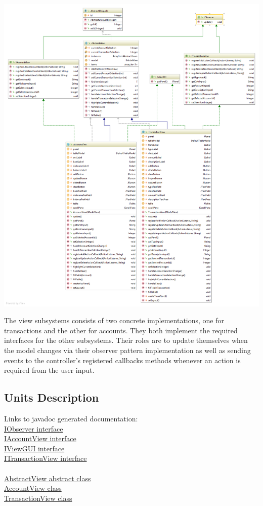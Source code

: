 \documentclass[12pt]{article}
\begin{document}
\includegraphics[width=\textwidth,height=\textheight,keepaspectratio]{Diagrams/UML/View.png}
\bigskip

\newpage
The view subsystems consists of two concrete implementations, one for transactions and the other for accounts. They both implement the required interfaces for the other subsystems. Their roles are to update themselves when the model changes via their observer pattern implementation as well as sending events to the controller's registered callbacks methods whenever an action is required from the user input.\\

\subsection{Units Description}

Links to javadoc generated documentation:\\
\href{run:javadoc/IObserver.html}{IObserver interface}\\
\href{run:javadoc/IAccountView.html}{IAccountView interface}\\
\href{run:javadoc/IViewGUI.html}{IViewGUI interface}\\
\href{run:javadoc/ITransactionView.html}{ITransactionView interface}\\
\\
\href{run:javadoc/AbstractView.html}{AbstractView abstract class}\\
\href{run:javadoc/AccountView.html}{AccountView class}\\
\href{run:javadoc/TransactionView.html}{TransactionView class}\\
\end{document}
